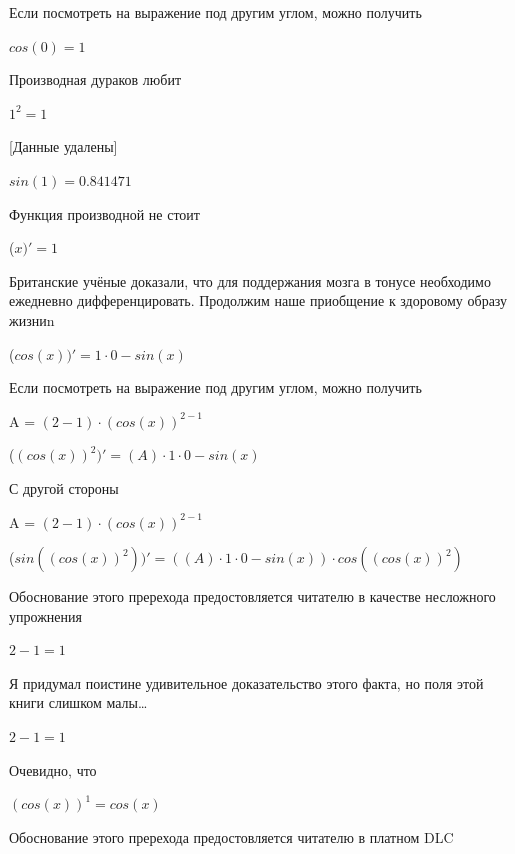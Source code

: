 \documentclass[12pt,a4paper,fleqn]{article}
\begin{document}
Если посмотреть на выражение под другим углом, можно получить

\begin{center}$cos(0) = 1$\end{center}
Производная дураков любит\cite{link2}

\begin{center}$1^{2} = 1$\end{center}
[Данные удалены]

\begin{center}$sin(1) = 0.841471$\end{center}
Функция производной не стоит\cite{link2}

\begin{center}
 ($x)'
  = 1$\end{center}
Британские учёные доказали, что для поддержания мозга в тонусе необходимо ежедневно дифференцировать. Продолжим наше приобщение к здоровому образу жизниn

\begin{center}
 ($cos(x))'
  = 1 \cdot 0-sin(x)$\end{center}
Если посмотреть на выражение под другим углом, можно получить

\begin{center}
A = $(2-1) \cdot (cos(x))^{2-1}$\end{center}
\begin{center}
 ($(cos(x))^{2})'
  = (A) \cdot 1 \cdot 0-sin(x)$\end{center}
С другой стороны

\begin{center}
A = $(2-1) \cdot (cos(x))^{2-1}$\end{center}
\begin{center}
 ($sin((cos(x))^{2}))'
  = ((A) \cdot 1 \cdot 0-sin(x)) \cdot cos((cos(x))^{2})$\end{center}
Обоснование этого пререхода предостовляется читателю в качестве несложного упрожнения

\begin{center}$2-1 = 1$\end{center}
Я придумал поистине удивительное доказательство этого факта, но поля этой книги слишком малы\ldots

\begin{center}$2-1 = 1$\end{center}
Очевидно, что

\begin{center}
$(cos(x))^{1} = cos(x)$\end{center}
Обоснование этого пререхода предостовляется читателю в платном DLC
\end{document}
